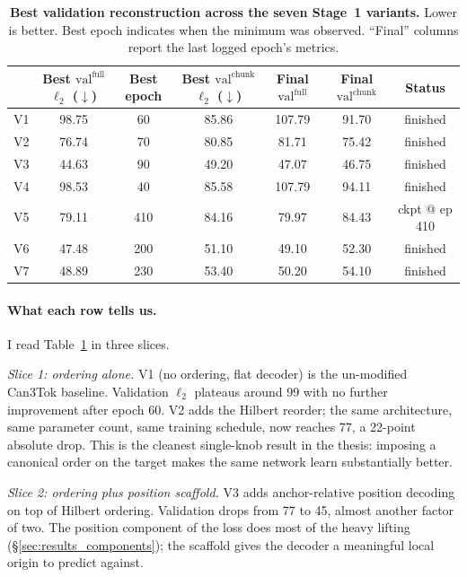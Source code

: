 \begin{table}[t]
  \centering
  \caption[Headline numbers for the seven-variant ablation]{\textbf{Best validation reconstruction across the seven Stage~1 variants.} Lower is better. Best epoch indicates when the minimum was observed. ``Final'' columns report the last logged epoch's metrics.}
  \label{tab:7_summary}
  {\small
  \begin{tabular}{lcccccc}
    \toprule
        & Best $\text{val}^{\text{full}}$ $\ell_2$ ($\downarrow$) & Best epoch & Best $\text{val}^{\text{chunk}}$ $\ell_2$ ($\downarrow$) & Final $\text{val}^{\text{full}}$ & Final $\text{val}^{\text{chunk}}$ & Status \\
    \midrule
    V1  & 98.75  & 60  & 85.86 & 107.79 & 91.70 & finished \\
    V2  & 76.74  & 70  & 80.85 & 81.71  & 75.42 & finished \\
    V3  & 44.63  & 90  & 49.20 & 47.07  & 46.75 & finished \\
    V4  & 98.53  & 40  & 85.58 & 107.79 & 94.11 & finished \\
    V5  & 79.11  & 410 & 84.16 & 79.97  & 84.43 & ckpt @ ep 410 \\
    V6  & 47.48  & 200 & 51.10 & 49.10  & 52.30 & finished \\
    V7  & 48.89  & 230 & 53.40 & 50.20  & 54.10 & finished \\
    \bottomrule
  \end{tabular}}
\end{table}

\paragraph{What each row tells us.} I read Table~\ref{tab:7_summary} in three slices.

\emph{Slice 1: ordering alone.} V1 (no ordering, flat decoder) is the un-modified Can3Tok baseline. Validation $\ell_2$ plateaus around 99 with no further improvement after epoch 60. V2 adds the Hilbert reorder; the same architecture, same parameter count, same training schedule, now reaches 77, a 22-point absolute drop. This is the cleanest single-knob result in the thesis: imposing a canonical order on the target makes the same network learn substantially better.

\emph{Slice 2: ordering plus position scaffold.} V3 adds anchor-relative position decoding on top of Hilbert ordering. Validation drops from 77 to 45, almost another factor of two. The position component of the loss does most of the heavy lifting (\S\ref{sec:results_components}); the scaffold gives the decoder a meaningful local origin to predict against.

